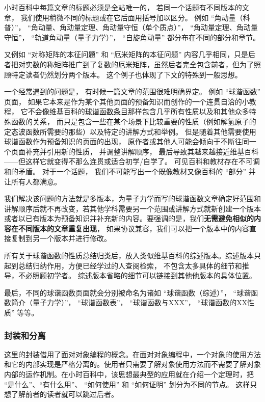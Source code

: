小时百科中每篇文章的标题必须是全站唯一的， 若同一个话题有不同版本的文章， 我们使用稍微不同的标题或在它后面用括号加以区分。 例如 “角动量（科普）”， “角动量、角动量定理、角动量守恒（单个质点）”， “角动量定理、角动量守恒”， “轨道角动量（量子力学）”， “自旋角动量” 都分布在不同的部分和章节。

又例如 “对称矩阵的本征问题” 和 “厄米矩阵的本征问题” 内容几乎相同，只是后者把对实数的称矩阵推广到了复数的厄米矩阵，虽然后者完全包含前者，但为了照顾特定读者仍然划分两个版本。 这个例子也体现了下文的特殊到一般思想。


一个经常遇到的问题是， 有时候一篇文章的范围很难明确界定。 例如 “球谐函数” 页面， 如果它本来是作为某个其他页面的预备知识而创作的一个连贯自洽的小教程， 它不会像维基百科的\href{https://en.wikipedia.org/wiki/Spherical_harmonics}{球谐函数条目}那样包含几乎所有性质以及和其他众多特殊函数的关系， 而只是包含一些在某个场景下比较重要的性质（例如解氢原子的定态波函数所需要的那些）以及特定的讲解方式和举例。 但是随着其他需要使用球谐函数作为预备知识的页面的出现， 原作者或其他人可能会倾向于不断往同一个页面补充并引用新的性质， 并调整讲解顺序， 最后导致其越来越接近维基百科——但这样它就变得不那么连贯或适合初学/自学了。 可见百科和教材存在不可调和的矛盾。 对于一个话题， 我们不可能写出一个既像教材又像百科的 “部分” 并让所有人都满意。

我们解决该问题的方法就是多版本，为量子力学而写的球谐函数文章确定好范围和讲解顺序后就不再改变，若其他学科需要另一个范围或讲解方式就新创建一个版本或者以已有版本为预备知识并补充新的内容。要强调的是，我们\textbf{无需避免相似的内容在不同版本的文章重复出现}， 如果协议兼容，我们可以把一个版本中的内容直接复制到另一个版本并进行修改。

所有关于球谐函数的性质总结归类后，放入类似维基百科的综述版本。综述版本只起到总结归纳作用，方便已经学过的人查阅检索， 不包含太多具体的细节和推导，不必照顾初学者。 综述版本省略的细节可以链接到其他他版本的具体位置。

最后，不同的球谐函数页面就会分别被命名为诸如 “球谐函数（综述）”， “球谐函数简介（量子力学）”， “球谐函数表”， “球谐函数与XXX”， “球谐函数的XX性质” 等等。

\subsubsection{封装和分离}
这里的封装借用了面对对象编程的概念。在面对对象编程中，一个对象的使用方法和它的内部实现是严格分离的。使用者只需要了解对象使用方法而不需要了解对象内部的运作机制。在小时百科中，该思想最典型的应用就在介绍一个定理时，把 “是什么”、“有什么用”、 “如何使用” 和 “如何证明” 划分为不同的节点。 这样只想了解前者的读者就可以跳过后者。

